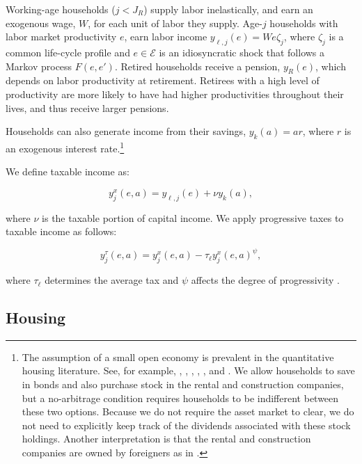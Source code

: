 \documentclass[parskip=full]{article}
\begin{document}
Working-age households ($j<J_{R}$) supply labor inelastically, and earn an exogenous wage, $W$, for each unit of labor they supply. Age-$j$ households with labor market productivity $e$, earn labor income $y_{\ell,j}(e)=We\zeta_j$, where $\zeta_j$ is a common life-cycle profile and $e\in \mathcal{E}$ is an idiosyncratic shock that follows a Markov process $F(e,e')$. Retired households receive a pension, $y_{R}(e)$, which depends on labor productivity at retirement. Retirees with a high level of productivity are more likely to have had higher productivities throughout their lives, and thus receive larger pensions. 

Households can also generate income from their savings, $y_{k}(a)=ar$, where $r$ is an exogenous interest rate.\footnote{The assumption of a small open economy is prevalent in the quantitative housing literature. See, for example, \citet{sommeretal-2013}, \citet{arslanetal-2015}, \citet{floettotetal-2016}, \cite{sommersullivan-2017}, \citet{kaplanetal-2019}, and \citet{kkk-2021}. We allow households to save in bonds and also purchase stock in the rental and construction companies, but a no-arbitrage condition requires households to be indifferent between these two options. Because we do not require the asset market to clear, we do not need to explicitly keep track of the dividends associated with these stock holdings. Another interpretation is that the rental and construction companies are owned by foreigners as in \citet{floettotetal-2016}.}

We define taxable income as:

\begin{equation*}\label{eq:taxable_labor_income}
  y^{x}_{j}(e,a) =y_{\ell,j}(e)+\nu y_{k}(a),
\end{equation*}

\noindent where $\nu$ is the taxable portion of capital income. We apply progressive taxes to taxable income as follows:

\begin{equation}\label{eq:income_tax}
  y^{\tau}_{j}(e,a) = y^{x}_{j}(e,a)-\tau_{\ell}y^{x}_{j}(e,a)^{\psi},
\end{equation}

\noindent where $\tau_{\ell}$ determines the average tax and $\psi$ affects the degree of progressivity \citep{hsv-2020}.

\subsection{Housing}\label{subsection:housing_choice}
\end{document}
